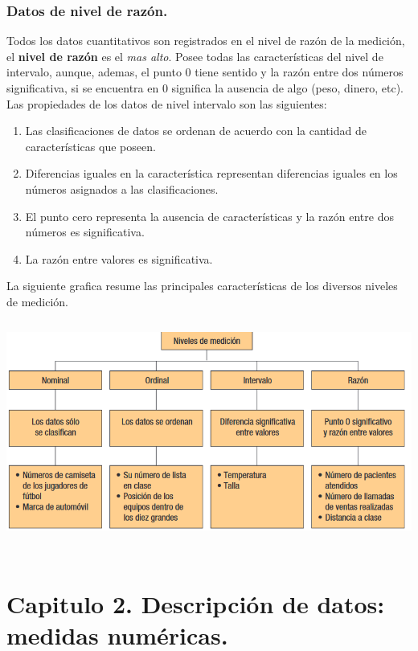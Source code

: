 \documentclass[]{article}
\begin{document}
\subsubsection*{Datos de nivel de razón.}
Todos los datos cuantitativos son registrados en el nivel de razón de la medición, el \textbf{nivel de razón} es el \textit{mas alto}. Posee todas las características del nivel de intervalo, aunque, ademas, el punto 0 tiene sentido y la razón entre dos números significativa, si se encuentra en 0 significa la ausencia de algo (peso, dinero, etc). Las propiedades de los datos de nivel intervalo son las siguientes:
\begin{enumerate}
	\item Las clasificaciones de datos se ordenan de acuerdo con la cantidad de características que poseen.
	\item Diferencias iguales en la característica representan diferencias iguales en los números asignados a las clasificaciones.
	\item El punto cero representa la ausencia de características y la razón entre dos números es significativa.
	\item La razón entre valores es significativa.
\end{enumerate}
La siguiente grafica resume las principales características de los diversos niveles de medición.
\\
\includegraphics[width=16cm, height=8cm]{imagenes/resumenCaracteristicasNivelesMedicion1_3}
\section{Capitulo 2. Descripción de datos: medidas numéricas.}
\end{document}
